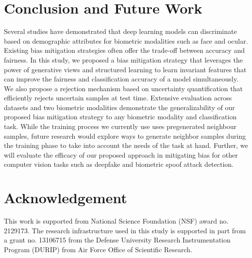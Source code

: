 \documentclass[runningheads]{llncs}
\begin{document}
\section{Conclusion and Future Work}
Several studies have demonstrated that deep learning models can discriminate based on demographic attributes for biometric modalities such as face and ocular. Existing bias mitigation strategies often offer the trade-off between accuracy and fairness. In this study, we proposed a bias mitigation strategy that leverages the power of generative views and structured learning to learn invariant features that can improve the fairness and classification accuracy of a model simultaneously. We also propose a rejection mechanism based on uncertainty quantification that efficiently rejects uncertain samples at test time. Extensive evaluation across datasets and two biometric modalities demonstrate the generalizability of our proposed bias mitigation strategy to any biometric modality and classification task.  While the training process we currently use uses pregenerated neighbour samples, future research would explore ways to generate neighbor samples during the training phase to take into account the needs of the task at hand. Further, we will evaluate the efficacy of our proposed approach in mitigating bias for other computer vision tasks such as deepfake and biometric spoof attack detection.



\section{Acknowledgement}
This work is supported from National Science Foundation (NSF) award
no. 2129173. The research infrastructure used in this study is supported in part from a grant no. 13106715 from the Defense University Research Instrumentation Program (DURIP) from Air Force Office of Scientific Research.



\end{document}
